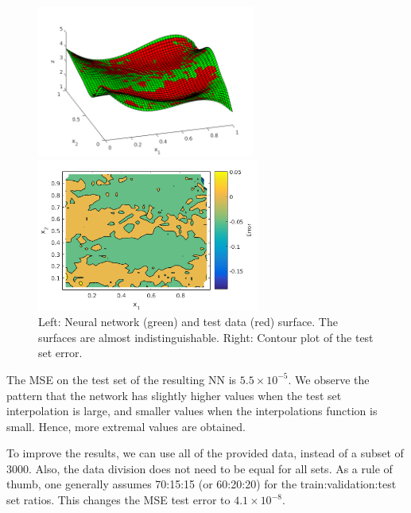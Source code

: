 \documentclass[pdftex,11pt,a4paper]{article}
\begin{document}
\begin{figure}[tbh]
\centering
\begin{minipage}{0.5\textwidth}
\includegraphics[height=5cm]{figs/NN_and_testsurf.png}
\end{minipage}%
\begin{minipage}{0.5\textwidth}
\includegraphics[height=5cm]{figs/NN_test_error.png}
\end{minipage}%
\caption{Left: Neural network (green) and test data (red) surface. The surfaces are almost indistinguishable. Right: Contour plot of the test set error. \label{fig:NN_and_testsurf}}
\end{figure}

The MSE on the test set of the resulting NN is $5.5 \times 10^{-5}$. We observe the pattern that the network has slightly higher values when the test set interpolation is large, and smaller values when the interpolations function is small. Hence, more extremal values are obtained.

To improve the results, we can use all of the provided data, instead of a subset of $3000$. Also, the data division does not need to be equal for all sets. As a rule of thumb, one generally assumes 70:15:15 (or 60:20:20) for the train:validation:test set ratios. This changes the MSE test error to $4.1\times10^{-8}$.
\end{document}
